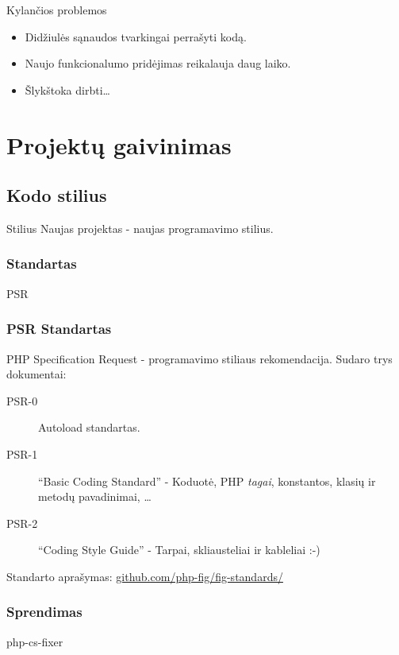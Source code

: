 \documentclass[12pt,a4paper]{beamer}
\begin{document}
\begin{frame}{Kylančios problemos}
    \begin{itemize}
        \item Didžiulės sąnaudos tvarkingai perrašyti kodą.
        \item Naujo funkcionalumo pridėjimas reikalauja daug laiko.
        \item Šlykštoka dirbti\dots
    \end{itemize}
\end{frame}

\section{Projektų gaivinimas}

\subsection{Kodo stilius}
\begin{frame}{Stilius}
    Naujas projektas - naujas programavimo stilius.
\end{frame}

\begin{frame}[fragile]
    \frametitle{Standartas}

    {\Huge PSR}
\end{frame}

\begin{frame}
    \frametitle{PSR Standartas}
    {\large PHP Specification Request - programavimo stiliaus rekomendacija.}
    \vskip15pt
    \pause
    Sudaro trys dokumentai:
    \begin{description}
        \item[PSR-0] Autoload standartas.
        \pause
        \item[PSR-1] ``Basic Coding Standard'' - Koduotė, PHP \textit{tagai}, konstantos, klasių ir metodų pavadinimai, \dots
        \pause
        \item[PSR-2] ``Coding Style Guide'' - Tarpai, skliausteliai ir kableliai :-)
        \pause
    \end{description}
    \vskip10pt
    {\small Standarto aprašymas: \href{https://github.com/php-fig/fig-standards/}{github.com/php-fig/fig-standards/}}
\end{frame}

\begin{frame}[fragile]
    \frametitle{Sprendimas}

    {\Huge php-cs-fixer}
\end{frame}
\end{document}
